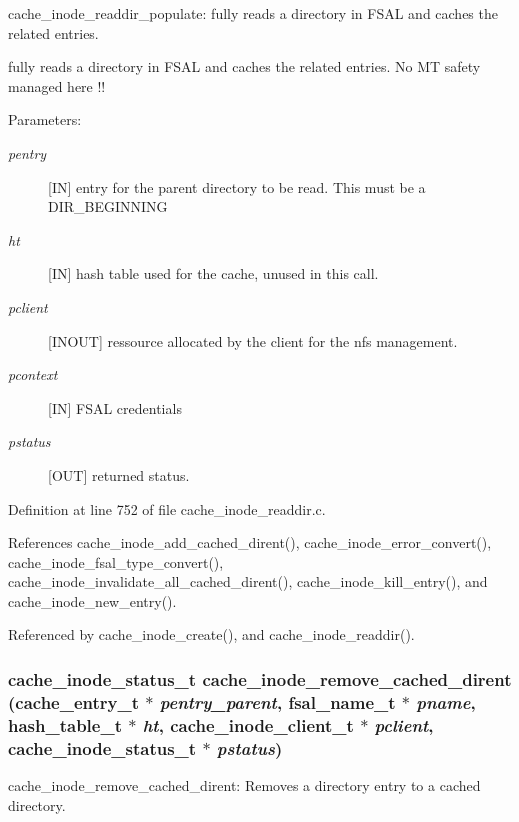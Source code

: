 cache\_\-inode\_\-readdir\_\-populate: fully reads a directory in FSAL and caches the related entries.

fully reads a directory in FSAL and caches the related entries. No MT safety managed here !!

\begin{Desc}
\item[Parameters:]
\begin{description}
\item[{\em pentry}][IN] entry for the parent directory to be read. This must be a DIR\_\-BEGINNING \item[{\em ht}][IN] hash table used for the cache, unused in this call. \item[{\em pclient}][INOUT] ressource allocated by the client for the nfs management. \item[{\em pcontext}][IN] FSAL credentials \item[{\em pstatus}][OUT] returned status. \end{description}
\end{Desc}


Definition at line 752 of file cache\_\-inode\_\-readdir.c.

References cache\_\-inode\_\-add\_\-cached\_\-dirent(), cache\_\-inode\_\-error\_\-convert(), cache\_\-inode\_\-fsal\_\-type\_\-convert(), cache\_\-inode\_\-invalidate\_\-all\_\-cached\_\-dirent(), cache\_\-inode\_\-kill\_\-entry(), and cache\_\-inode\_\-new\_\-entry().

Referenced by cache\_\-inode\_\-create(), and cache\_\-inode\_\-readdir().
\subsubsection{\setlength{\rightskip}{0pt plus 5cm}cache\_\-inode\_\-status\_\-t cache\_\-inode\_\-remove\_\-cached\_\-dirent (cache\_\-entry\_\-t $\ast$ {\em pentry\_\-parent}, fsal\_\-name\_\-t $\ast$ {\em pname}, hash\_\-table\_\-t $\ast$ {\em ht}, cache\_\-inode\_\-client\_\-t $\ast$ {\em pclient}, cache\_\-inode\_\-status\_\-t $\ast$ {\em pstatus})}\label{cache__inode__readdir_8c_a3}


cache\_\-inode\_\-remove\_\-cached\_\-dirent: Removes a directory entry to a cached directory.

